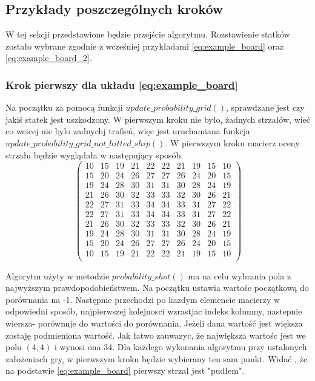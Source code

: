 \documentclass[magisterska]{pracadypl}
\begin{document}
\subsection{Przykłady poszczególnych kroków}
W tej sekcji przedstawione będzie przejście algorytmu. Rozstawienie statków zostało wybrane zgodnie z wcześniej przykładami \eqref{eq:example_board} oraz \eqref{eq:example_board_2}.
\subsubsection{Krok pierwszy dla układu \eqref{eq:example_board}}
Na początku za pomocą funkcji $update\_probability\_grid()$, sprawdzane jest czy jakiś statek jest uszkodzony. W pierwszym kroku nie było, żadnych strzałów, wieć co weicej nie bylo zadnychj trafień, więc jest uruchamiana funkcja $update\_probability\_grid\_not\_hitted\_ship()$.
W pierwszym kroku macierz oceny strzału będzie wyglądała w następujący sposób.
$$
\begin{pmatrix}
10 & 15 & 19 & 21 & 22 & 22 & 21 & 19 & 15 & 10 \\
15 & 20 & 24 & 26 & 27 & 27 & 26 & 24 & 20 & 15 \\
19 & 24 & 28 & 30 & 31 & 31 & 30 & 28 & 24 & 19 \\
21 & 26 & 30 & 32 & 33 & 33 & 32 & 30 & 26 & 21 \\
22 & 27 & 31 & 33 & 34 & 34 & 33 & 31 & 27 & 22 \\
22 & 27 & 31 & 33 & 34 & 34 & 33 & 31 & 27 & 22 \\
21 & 26 & 30 & 32 & 33 & 33 & 32 & 30 & 26 & 21 \\
19 & 24 & 28 & 30 & 31 & 31 & 30 & 28 & 24 & 19 \\
15 & 20 & 24 & 26 & 27 & 27 & 26 & 24 & 20 & 15 \\
10 & 15 & 19 & 21 & 22 & 22 & 21 & 19 & 15 & 10 \\
\end{pmatrix}
$$

Algorytm użyty w metodzie $probability\_shot()$ ma na celu wybrania pola z najwyższym prawdopodobieństwem. Na początku ustawia wartośc początkową do porównania na -1. Następnie przechodzi po kazdym elemencie macierzy w odpowiedni sposób, najpierwszej kolejnosci wzrastjac indeks kolumny, nastepnie wiersza- porównuje do wartości do porównania. Jeżeli dana wartość jest większa zostaję podmieniona wartość. Jak łatwo zauwazyc, że największa wartośc jest we polu $(4,4)$ i wynosi ona 34. Dla każdego wykonania algorytmu przy ustalonych założeniach gry, w pierwszym kroku będzie wybierany ten sam punkt.
Widać , że na podstawie \eqref{eq:example_board} pierwszy strzał jest "pudłem".
\end{document}
